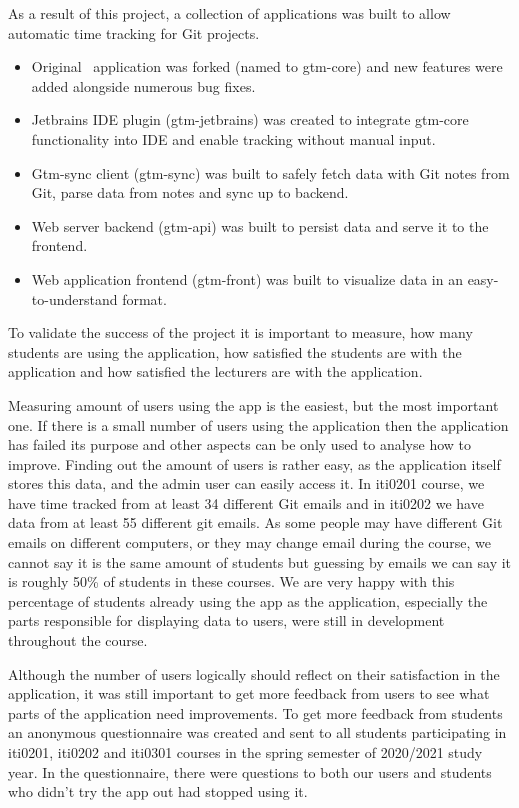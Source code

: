 As a result of this project, a collection of applications was built to allow automatic time tracking for Git projects.
\begin{itemize}
    \item Original~ application was forked (named to gtm-core) and new features were added
    alongside numerous bug fixes.
    \item Jetbrains IDE plugin (gtm-jetbrains) was created to integrate gtm-core functionality into IDE and enable tracking without manual input.
    \item Gtm-sync client (gtm-sync) was built to safely fetch data with Git notes from Git, parse data from notes and sync up to backend.
    \item Web server backend (gtm-api) was built to persist data and serve it to the frontend.
    \item Web application frontend (gtm-front) was built to visualize data in an easy-to-understand format.
\end{itemize}

To validate the success of the project it is important to measure, how many students are using the application,
how satisfied the students are with the application and how satisfied the lecturers are with the application.

Measuring amount of users using the app is the easiest, but the most important one.
If there is a small number of users using the application then the application has failed its purpose and other
aspects can be only used to analyse how to improve.
Finding out the amount of users is rather easy, as the application itself stores this data, and the admin user can easily access it.
In iti0201 course, we have time tracked from at least 34 different Git emails and in iti0202 we have data from at least 55 different git emails.
As some people may have different Git emails on different computers, or they may change email during the course, we cannot say it
is the same amount of students but guessing by emails we can say it is roughly 50\% of students in these courses.
We are very happy with this percentage of students already using the app as the application, especially the parts
responsible for displaying data to users, were still in development throughout the course.

Although the number of users logically should reflect on their satisfaction in the application, it was still important to
get more feedback from users to see what parts of the application need improvements.
To get more feedback from students an anonymous questionnaire was created and sent to all students participating in iti0201, iti0202
and iti0301 courses in the spring semester of 2020/2021 study year.
In the questionnaire, there were questions to both our users and students who didn't try the app out had stopped using it.

